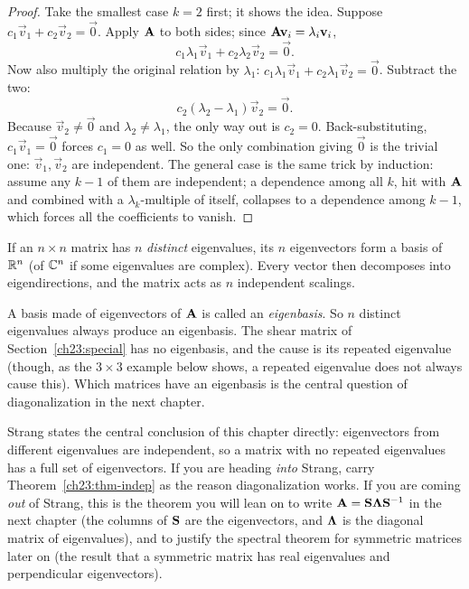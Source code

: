 \begin{proof}
Take the smallest case $k=2$ first; it shows the idea. Suppose
$c_1\vec{v}_1+c_2\vec{v}_2=\vec{0}$. Apply $\mathbf{A}$ to both sides; since
$\mathbf{A}\mathbf{v}_i=\lambda_i\mathbf{v}_i$,
\[
  c_1\lambda_1\vec{v}_1+c_2\lambda_2\vec{v}_2=\vec{0}.
\]
Now also multiply the original relation by $\lambda_1$:
$c_1\lambda_1\vec{v}_1+c_2\lambda_1\vec{v}_2=\vec{0}$. Subtract the two:
\[
  c_2(\lambda_2-\lambda_1)\vec{v}_2=\vec{0}.
\]
Because $\vec{v}_2\neq\vec{0}$ and $\lambda_2\neq\lambda_1$, the only way out is
$c_2=0$. Back-substituting, $c_1\vec{v}_1=\vec{0}$ forces $c_1=0$ as well. So the
only combination giving $\vec{0}$ is the trivial one: $\vec{v}_1,\vec{v}_2$ are
independent. The general case is the same trick by induction: assume any $k-1$ of
them are independent; a dependence among all $k$, hit with $\mathbf{A}$ and combined
with a $\lambda_k$-multiple of itself, collapses to a dependence among $k-1$, which
forces all the coefficients to vanish.
\end{proof}

\begin{corollary}
\label{ch23:cor-basis}
If an $n\times n$ matrix has $n$ \emph{distinct} eigenvalues, its $n$ eigenvectors
form a basis of $\mathbb{R}^n$ (of $\mathbb{C}^n$ if some eigenvalues are complex). Every vector then decomposes into
eigendirections, and the matrix acts as $n$ independent scalings.
\end{corollary}

A basis made of eigenvectors of $\mathbf{A}$ is called an \emph{eigenbasis}. So
$n$ distinct eigenvalues always produce an eigenbasis. The shear matrix of
Section~\ref{ch23:special} has no eigenbasis, and the cause is its repeated
eigenvalue (though, as the $3\times 3$ example below shows, a repeated eigenvalue
does not always cause this). Which matrices have an eigenbasis is the central
question of diagonalization in the next chapter.

\begin{strangbox}
Strang states the central conclusion of this chapter directly: eigenvectors from
different eigenvalues are independent, so a matrix with no repeated eigenvalues has
a full set of eigenvectors. If you are heading \emph{into} Strang, carry
Theorem~\ref{ch23:thm-indep} as the reason diagonalization works. If you are
coming \emph{out} of Strang, this is the theorem you will lean on to write
$\mathbf{A}=\mathbf{S}\mathbf{\Lambda}\mathbf{S}^{-1}$ in the next chapter (the columns of
$\mathbf{S}$ are the eigenvectors, and $\mathbf{\Lambda}$ is the diagonal matrix of
eigenvalues), and to justify the spectral theorem for symmetric matrices later on
(the result that a symmetric matrix has real eigenvalues and perpendicular
eigenvectors).
\end{strangbox}

